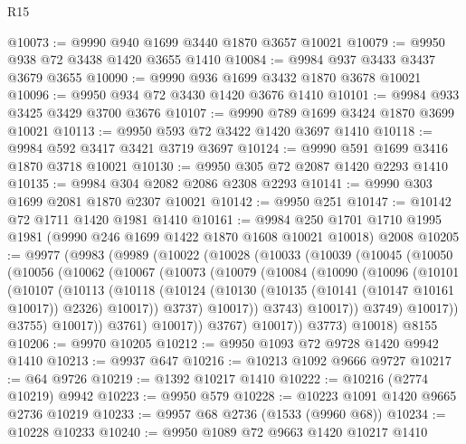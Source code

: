 \begin{lexlean}{R15}
\begin{coremodule}
@10073 := @9990 @940 @1699 @3440 @1870 @3657 @10021
@10079 := @9950 @938 @72 @3438 @1420 @3655 @1410
@10084 := @9984 @937 @3433 @3437 @3679 @3655
@10090 := @9990 @936 @1699 @3432 @1870 @3678 @10021
@10096 := @9950 @934 @72 @3430 @1420 @3676 @1410
@10101 := @9984 @933 @3425 @3429 @3700 @3676
@10107 := @9990 @789 @1699 @3424 @1870 @3699 @10021
@10113 := @9950 @593 @72 @3422 @1420 @3697 @1410
@10118 := @9984 @592 @3417 @3421 @3719 @3697
@10124 := @9990 @591 @1699 @3416 @1870 @3718 @10021
@10130 := @9950 @305 @72 @2087 @1420 @2293 @1410
@10135 := @9984 @304 @2082 @2086 @2308 @2293
@10141 := @9990 @303 @1699 @2081 @1870 @2307 @10021
@10142 := @9950 @251
@10147 := @10142 @72 @1711 @1420 @1981 @1410
@10161 := @9984
    @250
    @1701
    @1710
    @1995
    @1981
    (@9990 @246 @1699 @1422 @1870 @1608 @10021 @10018)
    @2008
@10205 := @9977
    (@9983
      (@9989
        (@10022
          (@10028
            (@10033
              (@10039
                (@10045
                  (@10050
                    (@10056
                      (@10062
                        (@10067
                          (@10073
                            (@10079
                              (@10084
                                (@10090
                                  (@10096
                                    (@10101
                                      (@10107
                                        (@10113
                                          (@10118
                                            (@10124
                                              (@10130
                                                (@10135 (@10141 (@10147 @10161 @10017)) @2326)
                                                @10017))
                                            @3737)
                                          @10017))
                                      @3743)
                                    @10017))
                                @3749)
                              @10017))
                          @3755)
                        @10017))
                    @3761)
                  @10017))
              @3767)
            @10017))
        @3773)
      @10018)
    @8155
@10206 := @9970 @10205
@10212 := @9950 @1093 @72 @9728 @1420 @9942 @1410
@10213 := @9937 @647
@10216 := @10213 @1092 @9666 @9727
@10217 := @64 @9726
@10219 := @1392 @10217 @1410
@10222 := @10216 (@2774 @10219) @9942
@10223 := @9950 @579
@10228 := @10223 @1091 @1420 @9665 @2736 @10219
@10233 := @9957 @68 @2736 (@1533 (@9960 @68))
@10234 := @10228 @10233
@10240 := @9950 @1089 @72 @9663 @1420 @10217 @1410

\end{coremodule}
\end{lexlean}

